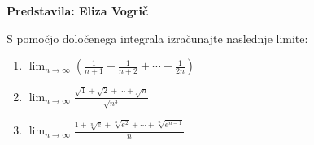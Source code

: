 \textbf{Predstavila: Eliza Vogrič} 

S pomočjo določenega integrala izračunajte naslednje limite:
\begin{enumerate}
  \item $\displaystyle \lim_{n \to \infty} \left( \frac{1}{n+1} + \frac{1}{n+2} + \cdots + \frac{1}{2n} \right)$
  \item $\displaystyle \lim_{n \to \infty} \frac{\sqrt{1} + \sqrt{2} + \cdots + \sqrt{n}}{\sqrt{n^{3}}}$
  \item $\displaystyle \lim_{n \to \infty} \frac{1 + \sqrt[n]{e} + \sqrt[n]{e^{2}} + \cdots + \sqrt[n]{e^{n-1}} }{n}$
\end{enumerate}